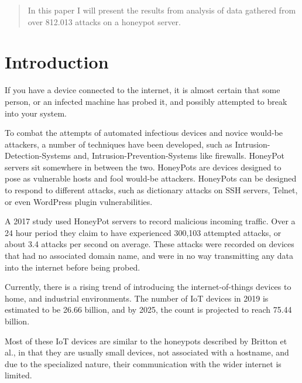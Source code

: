 
\begin{abstract}
    In this paper I will present the results 
    from analysis of data gathered from over
    812.013 attacks on a honeypot server.
    


\end{abstract}
%
%
%
\section{Introduction}
\label{sec:introduction}

    If you have a device connected to the
    internet, it is almost certain that some person,
    or an infected machine has probed it, and possibly
    attempted to break into your system. 


    To combat the attempts of automated infectious devices
    and novice would-be attackers, a number of techniques 
    have been developed, such as Intrusion-Detection-Systems 
    \cite{4693640} and, Intrusion-Prevention-Systems  like 
    firewalls. HoneyPot servers sit somewhere in between the
    two. HoneyPots are devices designed to pose as
    vulnerable hosts and fool would-be attackers. 
    HoneyPots can be designed to respond to 
    different attacks, such as dictionary attacks on SSH servers,
    Telnet, or even WordPress plugin vulnerabilities.


    A 2017 study \cite{Britton_Liu}
    used HoneyPot servers to record malicious
    incoming traffic. Over a 24 hour period they 
    claim to have experienced 300,103 attempted
    attacks, or about 3.4 attacks per second 
    on average. These attacks were recorded on 
    devices that had no associated domain name, 
    and were in no way transmitting any data 
    into the internet before being probed.

    
    Currently, there is a rising trend of introducing
    the internet-of-things  devices to 
    home, and industrial environments. The number of 
    IoT devices in 2019 is estimated to be 26.66 
    billion, and by 2025, the count is projected to 
    reach 75.44 billion. \cite{statista}

    
    Most of these IoT devices are similar to the honeypots
    described by Britton et al.\cite{Britton_Liu}, in that 
    they are usually small devices, not associated with 
    a hostname, and due to the specialized nature, their 
    communication with the wider internet is limited.


